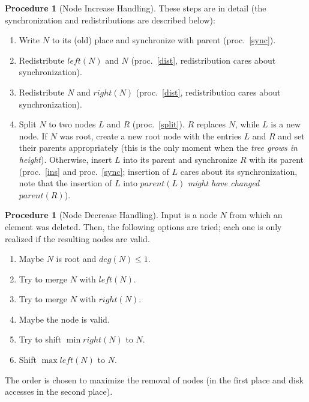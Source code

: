 \documentclass[a4paper, 8pt]{scrartcl}
\theoremstyle{plain}
\theoremstyle{definition}
\newtheorem{proc}[thm]{Procedure}
\theoremstyle{remark}
\begin{document}
\begin{multicols}{2}
\begin{proc}[Node Increase Handling]
These steps are in detail (the synchronization and redistributions are 
described below):
\begin{enumerate}
\item[ad 1.] Write $N$ to its (old) place and synchronize with parent
	(proc.~\ref{sync}).
\item[ad 2.] Redistribute $left(N)$ and $N$ (proc.~\ref{dist},
	redistribution cares about synchronization).
\item[ad 3.] Redistribute $N$ and $right(N)$ (proc.~\ref{dist},
	redistribution cares about synchronization).
\item[ad 4.] Split $N$ to two nodes $L$ and $R$ (proc.~\ref{split}).
	$R$ replaces $N$, while $L$ is a new node.
	If $N$ was root, create a new root node with the entries $L$ and $R$ and
	set their parents appropriately (this is the only moment when the
	{\em tree grows in height}).
	Otherwise, insert $L$ into its parent and synchronize $R$ with its parent
	(proc.~\ref{ins} and proc.~\ref{sync}; insertion of $L$ cares about its
	synchronization, note that the insertion of $L$ into $parent(L)$
	{\em might have changed} $parent(R)$).
\end{enumerate}
\end{proc}


\begin{proc}[Node Decrease Handling] \label{dec}
Input is a node $N$ from which an element was deleted.
Then, the following options are tried; each one is only realized if the
resulting nodes are valid.
\begin{enumerate}
\item Maybe $N$ is root and \mbox{$deg(N) \leq 1$}.
\item Try to merge $N$ with $left(N)$.
\item Try to merge $N$ with $right(N)$.
\item Maybe the node is valid.
\item Try to shift \mbox{$\min right(N)$} to $N$.
\item Shift \mbox{$\max left(N)$} to $N$.
\end{enumerate}
The order is chosen to maximize the removal of nodes (in the first place and
disk accesses in the second place).


\end{proc}
\end{multicols}
\end{document}

